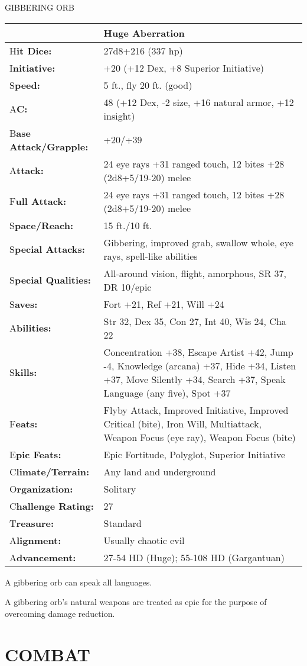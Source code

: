 \documentclass{article}
\begin{document}
{\vspace{12pt}
{\LARGE{}GIBBERING ORB }

\begin{tabular}{|>{\raggedright}p{66pt}|>{\raggedright}p{259pt}|}
\hline
  & Huge Aberration\tabularnewline
\hline
H\textbf{it Dice:} & 27d8+216 (337 hp) \tabularnewline
\hline
I\textbf{nitiative:} & +20 (+12 Dex, +8 Superior Initiative) \tabularnewline
\hline
S\textbf{peed:} & 5 ft., fly 20 ft. (good) \tabularnewline
\hline
A\textbf{C:} & 48 (+12 Dex, -2 size, +16 natural armor, +12 insight) \tabularnewline
\hline
B\textbf{ase Attack/Grapple:} & +20/+39\tabularnewline
\hline
A\textbf{ttack:} &  24 eye rays +31 ranged touch, 12 bites +28 (2d8+5/19-20) melee\tabularnewline
\hline
F\textbf{ull Attack:} & 24 eye rays +31 ranged touch, 12 bites +28 (2d8+5/19-20) 
melee\tabularnewline
\hline
S\textbf{pace/Reach:} & 15 ft./10 ft. \tabularnewline
\hline
S\textbf{pecial Attacks:} & Gibbering, improved grab, swallow whole, eye rays, 
spell-like abilities \tabularnewline
\hline
S\textbf{pecial Qualities:} & All-around vision, flight, amorphous, SR 37, DR 10/epic 
\tabularnewline
\hline
S\textbf{aves:} & Fort +21, Ref +21, Will +24 \tabularnewline
\hline
A\textbf{bilities:} & Str 32, Dex 35, Con 27, Int 40, Wis 24, Cha 22 \tabularnewline
\hline
S\textbf{kills:} & Concentration +38, Escape Artist +42, Jump -4, Knowledge (arcana) 
+37, Hide +34, Listen +37, Move Silently +34, Search +37, Speak Language (any five), 
Spot +37\tabularnewline
\hline
F\textbf{eats:} & Flyby Attack, Improved Initiative, Improved Critical (bite), 
Iron Will, Multiattack, Weapon Focus (eye ray), Weapon Focus (bite) \tabularnewline
\hline
E\textbf{pic Feats:} & Epic Fortitude, Polyglot, Superior Initiative \tabularnewline
\hline
C\textbf{limate/Terrain:} & Any land and underground\tabularnewline
\hline
O\textbf{rganization:} & Solitary \tabularnewline
\hline
C\textbf{hallenge Rating:} & 27 \tabularnewline
\hline
T\textbf{reasure:} & Standard \tabularnewline
\hline
A\textbf{lignment:} & Usually chaotic evil \tabularnewline
\hline
A\textbf{dvancement:} & 27-54 HD (Huge); 55-108 HD (Gargantuan) \tabularnewline
\hline
\end{tabular}

A gibbering orb can speak all languages.

A gibbering orb's natural weapons are treated as epic for the purpose of overcoming 
damage reduction.

\section*{COMBAT }

}
\end{document}
